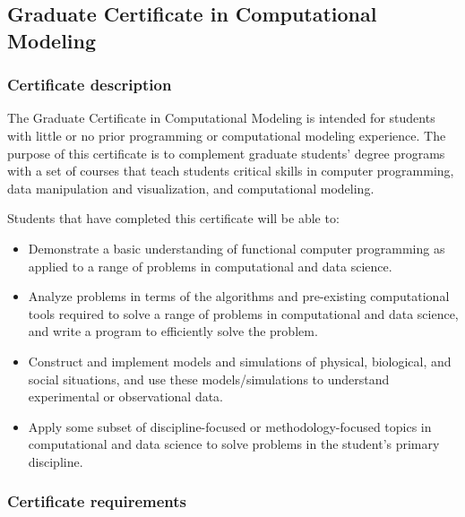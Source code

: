 \subsection{Graduate Certificate in Computational Modeling}
\label{sec:cert_model}

\subsubsection{Certificate description}

The Graduate Certificate in Computational Modeling is intended for
students with little or no prior programming or computational modeling
experience. The purpose of this certificate is to complement graduate
students' degree programs with a set of courses that teach students
critical skills in computer programming, data manipulation and
visualization, and computational modeling.  

\vspace{2mm}

\noindent
Students that have completed this certificate will be able to: 

\begin{itemize} 
\item  Demonstrate a basic understanding of functional computer
  programming as applied to a range of problems in computational and
  data science.  

\item  Analyze problems in terms of the algorithms and pre-existing
  computational tools required to solve a range of problems in
  computational and data science, and write a program to efficiently
  solve the problem.  

\item  Construct and implement models and simulations of physical,
  biological, and social situations, and use these models/simulations
  to understand experimental or observational data.  

\item  Apply some subset of discipline-focused or methodology-focused
topics in computational and data science to solve problems in the
student’s primary discipline.

\end{itemize}

\subsubsection{Certificate requirements}

